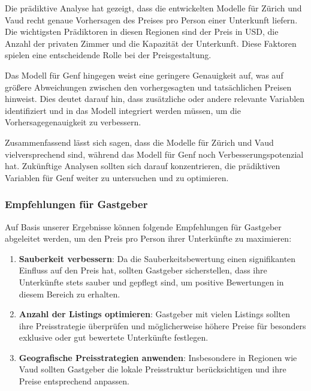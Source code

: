 \documentclass[
  journal,
]{IEEEtran}%
\begin{document}
Die prädiktive Analyse hat gezeigt, dass die entwickelten Modelle für
Zürich und Vaud recht genaue Vorhersagen des Preises pro Person einer
Unterkunft liefern. Die wichtigsten Prädiktoren in diesen Regionen sind
der Preis in USD, die Anzahl der privaten Zimmer und die Kapazität der
Unterkunft. Diese Faktoren spielen eine entscheidende Rolle bei der
Preisgestaltung.

Das Modell für Genf hingegen weist eine geringere Genauigkeit auf, was
auf größere Abweichungen zwischen den vorhergesagten und tatsächlichen
Preisen hinweist. Dies deutet darauf hin, dass zusätzliche oder andere
relevante Variablen identifiziert und in das Modell integriert werden
müssen, um die Vorhersagegenauigkeit zu verbessern.

Zusammenfassend lässt sich sagen, dass die Modelle für Zürich und Vaud
vielversprechend sind, während das Modell für Genf noch
Verbesserungspotenzial hat. Zukünftige Analysen sollten sich darauf
konzentrieren, die prädiktiven Variablen für Genf weiter zu untersuchen
und zu optimieren.

\hypertarget{empfehlungen-fuxfcr-gastgeber}{%
\subsubsection{Empfehlungen für
Gastgeber}\label{empfehlungen-fuxfcr-gastgeber}}

Auf Basis unserer Ergebnisse können folgende Empfehlungen für Gastgeber
abgeleitet werden, um den Preis pro Person ihrer Unterkünfte zu
maximieren:

\begin{enumerate}
\def\labelenumi{\arabic{enumi}.}
\item
  \textbf{Sauberkeit verbessern}: Da die Sauberkeitsbewertung einen
  signifikanten Einfluss auf den Preis hat, sollten Gastgeber
  sicherstellen, dass ihre Unterkünfte stets sauber und gepflegt sind,
  um positive Bewertungen in diesem Bereich zu erhalten.
\item
  \textbf{Anzahl der Listings optimieren}: Gastgeber mit vielen Listings
  sollten ihre Preisstrategie überprüfen und möglicherweise höhere
  Preise für besonders exklusive oder gut bewertete Unterkünfte
  festlegen.
\item
  \textbf{Geografische Preisstrategien anwenden}: Insbesondere in
  Regionen wie Vaud sollten Gastgeber die lokale Preisstruktur
  berücksichtigen und ihre Preise entsprechend anpassen.
\end{enumerate}
\end{document}
